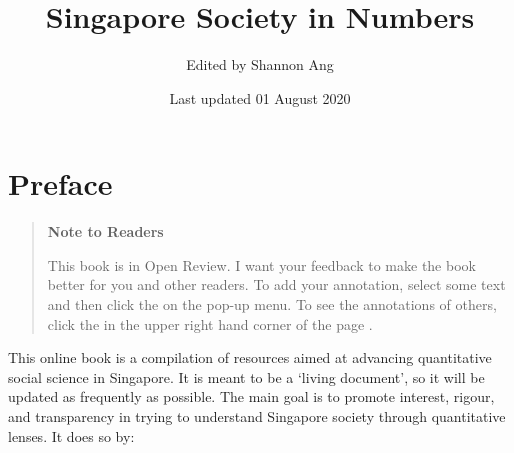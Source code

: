 \documentclass[
  openany]{book}
\title{Singapore Society in Numbers}
\author{Edited by Shannon Ang}
\date{Last updated 01 August 2020}
\begin{document}
\maketitle

{
\setcounter{tocdepth}{1}
\tableofcontents
}
\hypertarget{preface}{%
\chapter*{Preface}\label{preface}}

\begin{quote}
\textbf{Note to Readers}

This book is in Open Review. I want your feedback to make the book better for you and other readers. To add your annotation, {select some text} and then click the on the pop-up menu. To see the annotations of others, click the in the upper right hand corner of the page .
\end{quote}

This online book is a compilation of resources aimed at advancing quantitative social science in Singapore. It is meant to be a `living document', so it will be updated as frequently as possible. The main goal is to promote interest, rigour, and transparency in trying to understand Singapore society through quantitative lenses. It does so by:
\end{document}

